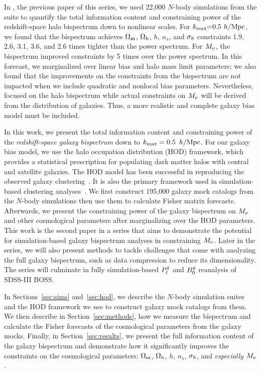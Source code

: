 In \cite{hahn2020}, the previous paper of this series, we used 22,000 $N$-body
simulations from the \quij suite to quantify the total information content and
constraining power of the redshift-space halo bispectrum down to nonlinear scales. 
For $k_{\rm max}{=}0.5~h/{\rm Mpc}$, we found that the bispectrum achieves $\Omega_{\rm m}$,
$\Omega_{\rm b}$, $h$, $n_s$, and $\sigma_8$ constraints 1.9, 2.6, 3.1, 3.6, and 2.6 times
tighter than the power spectrum. For $M_\nu$, the bispectrum improved 
constraints by 5 times over the power spectrum. In this forecast, we marginalized 
over linear bias and halo mass limit parameters; we also found that the
improvements on the constraints from the bispectrum are not impacted when we
include quadratic and nonlocal bias parameters. Nevertheless, \cite{hahn2020}
focused on the halo bispectrum while actual constraints on $M_\nu$ will be 
derived from the distribution of galaxies. Thus, a more realistic and complete 
galaxy bias model must be included.

In this work, we present the total information content and constraining power
of the {\em redshift-space galaxy bispectrum} down to $k_{\rm max}= 0.5~\,h/\mathrm{Mpc}$. For our galaxy
bias model, we use the halo occupation distribution (HOD) framework, which provides a
statistical prescription for populating dark matter halos with central and satellite
galaxies. The HOD model has been successful in reproducing the observed galaxy
clustering~\citep[\emph{e.g.}][]{zheng2005, leauthaud2012, tinker2013, zentner2016, vakili2019}. 
It is also the primary framework used in simulation-based clustering
analyses~\citep[\eg][]{mcclintock2018, zhai2019, lange2019, wibking2019}. 
We first construct 195,000 galaxy mock catalogs from the \quij $N$-body
simulations then use them to calculate Fisher matrix forecasts. Afterwards, we
present the constraining power of the galaxy bispectrum on $M_\nu$ and other 
cosmological parameters after marginalizing over the HOD parameters. This work
is the second paper in a series that aims to demonstrate the potential for
simulation-based galaxy bispectrum analyses in constraining $M_\nu$. Later in
the series, we will also present methods to tackle challenges that come with
analyzing the full galaxy bispectrum, such as data compression to reduce its
dimensionality. The series will culminate in fully simulation-based $P^g_{\ell}$ and
$B^g_0$ reanalysis of SDSS-III BOSS. 

In Sections~\ref{sec:sims} and~\ref{sec:hod}, we describe the \quij $N$-body simulation 
suites and the HOD framework we use to construct galaxy mock catalogs from them. We then 
describe in Section~\ref{sec:methods}, how we measure the bispectrum and
calculate the Fisher forecasts of the cosmological parameters from the galaxy
mocks. Finally, in Section~\ref{sec:results}, we present the full information
content of the galaxy bispectrum and demonstrate how it significantly improves
the constraints on the cosmological parameters: $\Omega_{\rm m}$, $\Omega_{\rm b}$, $h$, $n_s$,
$\sigma_8$, and {\em especially} $M_\nu$. 
